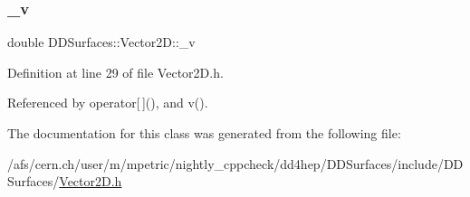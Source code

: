 \subsubsection{\texorpdfstring{\+\_\+v}{\_v}}
{\footnotesize\ttfamily double D\+D\+Surfaces\+::\+Vector2\+D\+::\+\_\+v\hspace{0.3cm}{\ttfamily [private]}}



Definition at line 29 of file Vector2\+D.\+h.



Referenced by operator\mbox{[}$\,$\mbox{]}(), and v().



The documentation for this class was generated from the following file\+:\begin{DoxyCompactItemize}
\item 
/afs/cern.\+ch/user/m/mpetric/nightly\+\_\+cppcheck/dd4hep/\+D\+D\+Surfaces/include/\+D\+D\+Surfaces/\hyperlink{_vector2_d_8h}{Vector2\+D.\+h}\end{DoxyCompactItemize}

